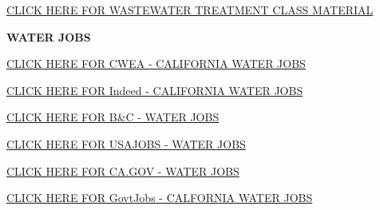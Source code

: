 \documentclass{article}
\begin{document}
\begin{tcolorbox}[width=17cm,box align=center, halign=center,  valign=center,colback={my-blue},title={}, colbacktitle=yellow,coltitle=blue]    
\href{https://sbasrai.github.io/BassettWWTreatment/BassettWWTreatment.html}{CLICK HERE FOR WASTEWATER TREATMENT CLASS MATERIAL}
\end{tcolorbox} 









\textbf{WATER JOBS}
\begin{tcolorbox}[width=17cm,box align=center, halign=center,  valign=center,colback={my-blue},title={}, colbacktitle=yellow,coltitle=blue]    
\href{https://jobs.cwea.org/jobs}{CLICK HERE FOR CWEA - CALIFORNIA WATER JOBS }
\end{tcolorbox}

\begin{tcolorbox}[width=17cm,box align=center, halign=center,  valign=center,colback={my-blue},title={}, colbacktitle=yellow,coltitle=blue]    
\href{https://www.indeed.com/jobs?q=water&l=California&vjk=b526b311e601df8c}{CLICK HERE FOR Indeed - CALIFORNIA WATER JOBS }
\end{tcolorbox}

\begin{tcolorbox}[width=17cm,box align=center, halign=center,  valign=center,colback={my-blue},title={}, colbacktitle=yellow,coltitle=blue]    
\href{https://du0000000h4aemas.my.salesforce-sites.com/ListJobs}{CLICK HERE FOR B\&C - WATER JOBS }
\end{tcolorbox}

\begin{tcolorbox}[width=17cm,box align=center, halign=center,  valign=center,colback={my-blue},title={}, colbacktitle=yellow,coltitle=blue]    
\href{https://www.usajobs.gov/Search/Results?l=&k=Water}{CLICK HERE FOR USAJOBS - WATER JOBS }
\end{tcolorbox}

\begin{tcolorbox}[width=17cm,box align=center, halign=center,  valign=center,colback={my-blue},title={}, colbacktitle=yellow,coltitle=blue]    
\href{https://www.calcareers.ca.gov/CalHRPublic/Search/JobSearchResults.aspx#kw=WAter}{CLICK HERE FOR CA.GOV - WATER JOBS }
\end{tcolorbox}


\begin{tcolorbox}[width=17cm,box align=center, halign=center,  valign=center,colback={my-blue},title={}, colbacktitle=yellow,coltitle=blue]    
\href{https://careers.govtjobs.com/jobs/view/senior-electrical-engineer-electrical-design/70135466/?keywords=water&pos_flt=0&location=California%
}{CLICK HERE FOR GovtJobs - CALFORNIA WATER JOBS }
\end{tcolorbox}
\end{document}
